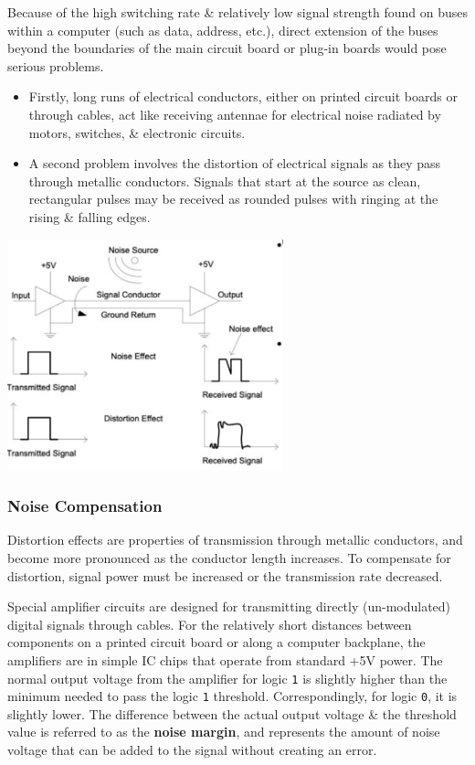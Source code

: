 \documentclass[11pt]{article}
\begin{document}
Because of the high switching rate \& relatively low signal strength found on buses within a computer (such as data, address, etc.), 
direct extension of the buses beyond the boundaries of the main circuit board or plug-in boards would pose serious problems. 
\begin{itemize}
    \item   Firstly, long runs of electrical conductors, either on printed circuit boards or through cables, act like receiving antennae 
            for electrical noise radiated by motors, switches, \& electronic circuits. 
    \item   A second problem involves the distortion of electrical signals as they pass through metallic conductors. 
            Signals that start at the source as clean, rectangular pulses may be received as rounded pulses with ringing at the 
            rising \& falling edges. 
\end{itemize}

\begin{center}
    \includegraphics[width=0.6\textwidth]{noisendistortion.png}
\end{center}

\subsubsection{Noise Compensation}
Distortion effects are properties of transmission through metallic conductors, and become more pronounced as the conductor length 
increases. 
To compensate for distortion, signal power must be increased or the transmission rate decreased. 

Special amplifier circuits are designed for transmitting directly (un-modulated) digital signals through cables. 
For the relatively short distances between components on a printed circuit board or along a computer backplane, the amplifiers 
are in simple IC chips that operate from standard +5V power. 
The normal output voltage from the amplifier for logic \verb|1| is slightly higher than the minimum needed to pass the logic 
\verb|1| threshold. 
Correspondingly, for logic \verb|0|, it is slightly lower. 
The difference between the actual output voltage \& the threshold value is referred to as the \textbf{noise margin}, and 
represents the amount of noise voltage that can be added to the signal without creating an error. 
\end{document}
